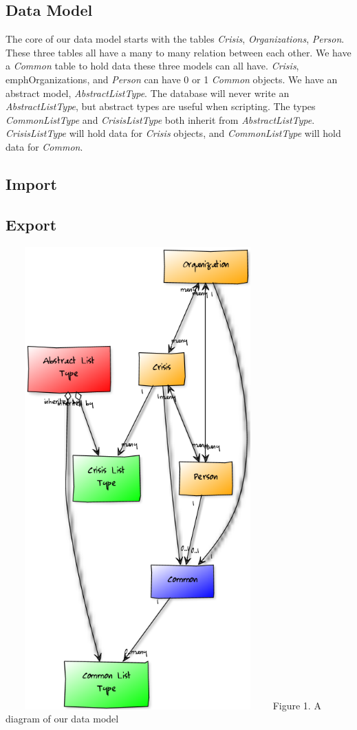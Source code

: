 \documentclass[12pt]{report}
\begin{document}
\subsection*{Data Model}
The core of our data model starts with the tables \emph{Crisis}, \emph{Organizations}, \emph{Person}.
These three tables all have a many to many relation between each other.
We have a \emph{Common} table to hold data these three models can all have.
\emph{Crisis}, emph{Organizations}, and \emph{Person} can have 0 or 1 \emph{Common} objects.
We have an abstract model, \emph{AbstractListType}.
The database will never write an \emph{AbstractListType}, but abstract types are useful when scripting.
The types \emph{CommonListType} and \emph{CrisisListType} both inherit from \emph{AbstractListType}.
\emph{CrisisListType} will hold data for \emph{Crisis} objects, and \emph{CommonListType} will hold data for \emph{Common}.

\subsection*{Import}

\subsection*{Export}

\newpage
\includegraphics*[width=4in,height=7in]{dataModelDiagram.png}
\newline
\footnotesize
Figure 1. A diagram of our data model %
\normalsize
\newpage
\end{document}
